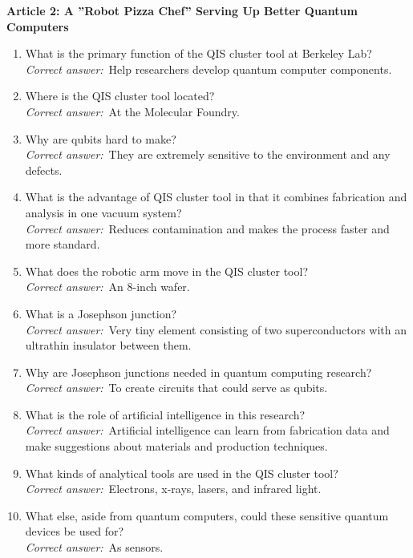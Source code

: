 \documentclass{IEEEtran}
\begin{document}
\textbf{Article 2: A ''Robot Pizza Chef'' Serving Up Better Quantum Computers}

\begin{enumerate}
   \item What is the primary function of the QIS cluster tool at Berkeley Lab?\\
   \textit{Correct answer:}~Help researchers develop quantum computer components.

    \item Where is the QIS cluster tool located?\\
   \textit{Correct answer:}~At the Molecular Foundry.

    \item Why are qubits hard to make?\\
   \textit{Correct answer:}~They are extremely sensitive to the environment and any defects.

    \item What is the advantage of QIS cluster tool in that it combines fabrication and analysis in one vacuum system?\\
   \textit{Correct answer:}~Reduces contamination and makes the process faster and more standard.

    \item What does the robotic arm move in the QIS cluster tool?\\
   \textit{Correct answer:}~An 8-inch wafer.

    \item What is a Josephson junction?\\
   \textit{Correct answer:}~Very tiny element consisting of two superconductors with an ultrathin insulator between them.

    \item Why are Josephson junctions needed in quantum computing research?\\
   \textit{Correct answer:}~To create circuits that could serve as qubits.

    \item What is the role of artificial intelligence in this research?\\
   \textit{Correct answer:}~Artificial intelligence can learn from fabrication data and make suggestions about materials and production techniques.

    \item What kinds of analytical tools are used in the QIS cluster tool?\\
   \textit{Correct answer:}~Electrons, x-rays, lasers, and infrared light.

    \item What else, aside from quantum computers, could these sensitive quantum devices be used for?\\
   \textit{Correct answer:}~As sensors.

\end{enumerate}
\end{document}
